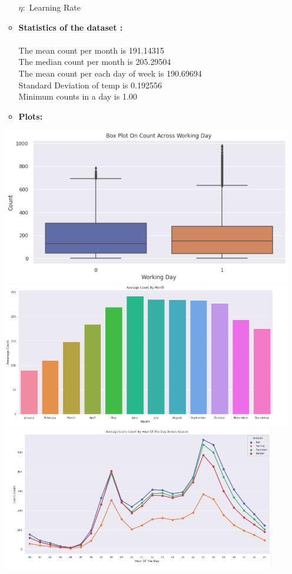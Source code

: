 \documentclass[english,a4paper,12pt]{article}
\begin{document}
\begin{enumerate}
\begin{itemize}
$\eta:$ Learning Rate
\vspace{2cm}
\item \textbf{Statistics of the dataset :} \\\\
   The mean count per month is 191.14315 \\
The median count per month is 205.29504\\
The mean count per each day of week is 190.69694\\
Standard Deviation of temp is 0.192556\\
Minimum counts in a day is 1.00\\
\newpage
\item \textbf{Plots:}
   \end{itemize} 
   
\includegraphics[width=15cm]{pictures/Plot_Q4_1.png} \\ 
\vspace{2cm}
\includegraphics[width=15cm]{pictures/Plot_Q4_2.png} \\ 
\newpage
\includegraphics[width=12cm]{pictures/Plot_Q4_3.png} \\ 

\end{enumerate}
\end{document}
